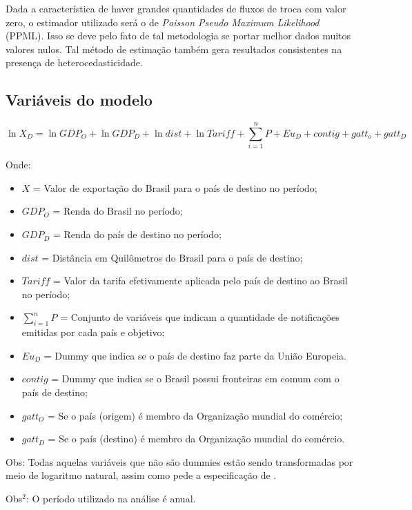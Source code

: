 \documentclass[12pt, a4paper]{article}
\begin{document}
Dada a característica de haver grandes quantidades de fluxos de troca com valor zero, o estimador utilizado será o de \emph{Poisson Pseudo Maximum Likelihood} (PPML). Isso se deve pelo fato de tal metodologia se portar melhor dados muitos valores nulos. Tal método de estimação também gera resultados consistentes na presença de heterocedasticidade. 

\subsection{Variáveis do modelo}

\begin{equation}
    \ln X_{D} = \ln GDP_{O} + \ln GDP_{D} + \ln dist + \ln Tariff + \sum_{i=1}^{n} P + Eu_{D} + contig + gatt_o + gatt_D
\end{equation}

Onde:

\begin{itemize}
    \item $X$ = Valor de exportação do Brasil para o país de destino no período;
    \item $GDP_{O}$ = Renda do Brasil no período;
    \item $GDP_{D}$ = Renda do país de destino no período;
    \item $dist$ = Distância em Quilômetros  do Brasil para o país de destino;
    \item $Tariff$ = Valor da tarifa efetivamente aplicada pelo país de destino ao Brasil no período;
    \item $\sum_{i=1}^{n} P$ = Conjunto de variáveis que indicam a quantidade de notificações emitidas por cada país e objetivo;
    \item $Eu_{D}$ = Dummy que indica se o país de destino faz parte da União Europeia.
    \item $contig$ = Dummy que indica se o Brasil possui fronteiras em comum com o país de destino;
    \item $gatt_O$ = Se o país (origem) é membro da Organização mundial do comércio;
    \item $gatt_D$ = Se o país (destino) é membro da Organização mundial do comércio.
\end{itemize}

Obs: Todas aquelas variáveis que não são dummies estão sendo transformadas por meio de logaritmo natural, assim como pede a especificação de \cite{Log_Of_Gravity}.

Obs$^2$: O período utilizado na análise é anual.
\end{document}
